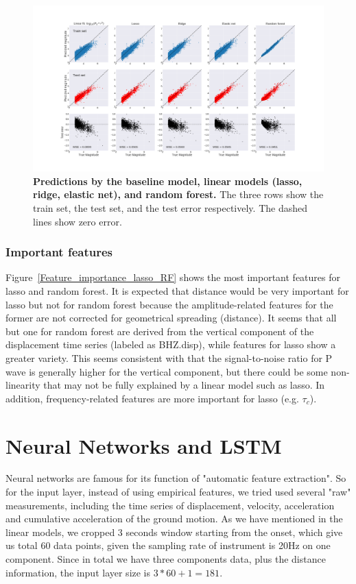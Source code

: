 \documentclass{article} %
\begin{document}
\begin{figure}[ht!]
	\centering
	\includegraphics*[scale=0.18, viewport= 85mm 40mm 800mm 460mm, angle=0]{./figure/prediction_vs_true.png}
	\caption{{\bf Predictions by the baseline model, linear models (lasso, ridge, elastic net), and random forest.} The three rows show the train set, the test set, and the test error respectively. The dashed lines show zero error.}\label{prediction_vs_true} 
\end{figure}




\subsubsection{Important features}
Figure~\ref{Feature_importance_lasso_RF} shows the most important features for lasso and random forest. It is expected that distance would be very important for lasso but not for random forest because the amplitude-related features for the former are not corrected for geometrical spreading (distance). It seems that all but one for random forest are derived from the vertical component of the displacement time series (labeled as BHZ.disp), while features for lasso show a greater variety. This seems consistent with that the signal-to-noise ratio for P wave is generally higher for the vertical component, but there could be some non-linearity that may not be fully explained by a linear model such as lasso. In addition, frequency-related features are more important for lasso (e.g. $\tau_c$).  




\section{Neural Networks and LSTM}
Neural networks are famous for its function of "automatic feature extraction". So for the input layer, instead of using empirical features, we tried used several "raw" measurements, including the time series of displacement, velocity, acceleration and cumulative acceleration of the ground motion. As we have mentioned in the linear models, we cropped 3 seconds window starting from the onset, which give us total 60 data points, given the sampling rate of instrument is 20Hz on one component. Since in total we have three components data, plus the distance information, the input layer size is $3*60 + 1 = 181$. 
\end{document}
